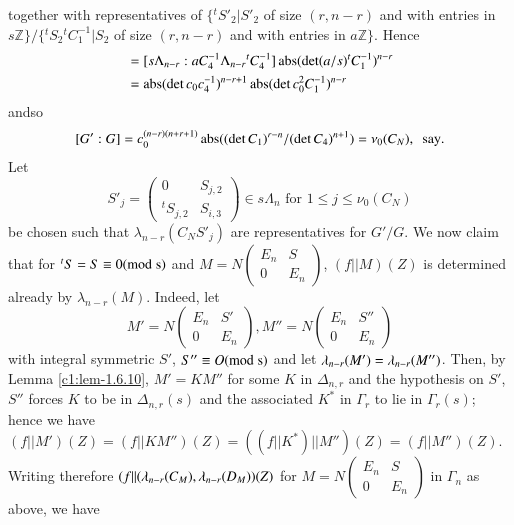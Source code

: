 together with representatives of $\{{}^{t}S'_{2}|S'_{2}$ of size
$(r,n-r)$ and with entries in
$s\mathbb{Z}\}/\{{}^{t}S_{2}{}^{t}C^{-1}_{1}|S_{2}$ of size $(r,n-r)$
and with entries in $a\mathbb{Z}\}$. Hence
\begin{align*}
[G_{0}:G] &=
[s\Lambda_{n-r}:aC^{-1}_{4}\Lambda_{n-r}{}^{t}C^{-1}_{4}]\abs(\det
(a/s)^{t}C^{-1}_{1})^{n-r}\\
&= \abs(\det c_{0}c^{-1}_{4})^{n-r+1}\abs(\det
c^{2}_{0}C^{-1}_{1})^{n-r} 
\end{align*}
and\pageoriginale so
$$
[G':G]=c_{0}^{(n-r)(n+r+1)}\operatorname{abs}((\det C_{1})^{r-n}/(\det
C_{4})^{n+1})=\nu_{0}(C_{N}),\text{ \ say}.
$$
Let
$$
S'_{j}=
\begin{pmatrix}
0 & S_{j,2}\\
{}^{t}S_{j,2} & S_{i,3}
\end{pmatrix}\in s\Lambda_{n}
\text{ \  for \ } 1\leq j\leq \nu_{0}(C_{N})
$$
be chosen such that $\lambda_{n-r}(C_{N}S'_{j})$ are representatives
for $G'/G$. We now claim that for ${}^{t}S=S\equiv 0(\rm{mod} \; s)$ and
$M=N\left(\begin{smallmatrix} E_{n} & S\\ 0 & E_{n}
\end{smallmatrix}\right)$, $(f||M)(Z)$ is determined already by
$\lambda_{n-r}(M)$. Indeed, let
$$
M'=N
\begin{pmatrix}
E_{n} & S'\\
0 & E_{n}
\end{pmatrix},
M''=N
\begin{pmatrix}
E_{n} & S''\\
0 & E_{n}
\end{pmatrix}
$$
with integral symmetric $S'$, $S''\equiv O(\rm{mod} \; s)$ and let
$\lambda_{n-r}(M')=\lambda_{n-r}\break(M'')$. Then, by Lemma
\ref{c1:lem-1.6.10}, $M'=KM''$ for some $K$ in $\Delta_{n,r}$ and the
hypothesis on $S'$, $S''$ forces $K$ to be in $\Delta_{n,r}(s)$ and
the associated $K^{\ast}$ in $\Gamma_{r}$ to lie in $\Gamma_{r}(s)$;
hence we have
$(f||M')(Z)=(f||KM'')(Z)=((f||K^{\ast})||M'')(Z)=(f||M'')(Z)$. Writing
therefore $(f||(\lambda_{n-r}(C_{M}),\lambda_{n-r}\break(D_{M}))(Z)$ for
$M=N
\left(\begin{smallmatrix} E_{n}  & S\\ 0 & E_{n}
\end{smallmatrix}\right)$ in $\Gamma_{n}$ as above, we have
